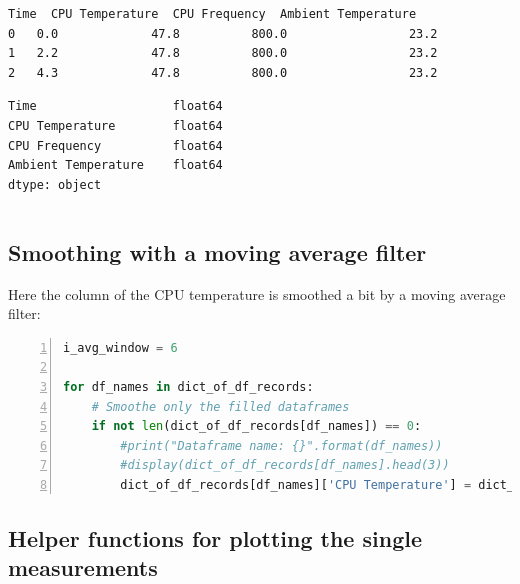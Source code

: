 \documentclass[10pt,parskip=half,
toc=sectionentrywithdots,
bibliography=totocnumbered,
captions=tableheading,numbers=noendperiod]{scrartcl}
\begin{document}
\begin{lstlisting}[language={},postbreak={},numbers=none,xrightmargin=7pt,breakindent=0pt,aboveskip=5pt,belowskip=5pt]
   Time  CPU Temperature  CPU Frequency  Ambient Temperature
0   0.0             47.8          800.0                 23.2
1   2.2             47.8          800.0                 23.2
2   4.3             47.8          800.0                 23.2
\end{lstlisting}

\begin{lstlisting}[language={},postbreak={},numbers=none,xrightmargin=7pt,breakindent=0pt,aboveskip=5pt,belowskip=5pt]
Time                   float64
CPU Temperature        float64
CPU Frequency          float64
Ambient Temperature    float64
dtype: object
\end{lstlisting}

\begin{lstlisting}[language={},postbreak={},numbers=none,xrightmargin=7pt,belowskip=5pt,aboveskip=5pt,breakindent=0pt]

\end{lstlisting}

\hypertarget{smoothing-with-a-moving-average-filter}{%
\subsection{Smoothing with a moving average
filter}\label{smoothing-with-a-moving-average-filter}}

Here the column of the CPU temperature is smoothed a bit by a moving
average filter:

\begin{lstlisting}[language=Python,numbers=left,xleftmargin=20pt,xrightmargin=5pt,belowskip=5pt,aboveskip=5pt]
i_avg_window = 6

for df_names in dict_of_df_records:
    # Smoothe only the filled dataframes
    if not len(dict_of_df_records[df_names]) == 0:
        #print("Dataframe name: {}".format(df_names))
        #display(dict_of_df_records[df_names].head(3))
        dict_of_df_records[df_names]['CPU Temperature'] = dict_of_df_records[df_names]['CPU Temperature'].rolling(window=i_avg_window).mean()
\end{lstlisting}

\hypertarget{helper-functions-for-plotting-the-single-measurements}{%
\subsection{Helper functions for plotting the single
measurements}\label{helper-functions-for-plotting-the-single-measurements}}
\end{document}
